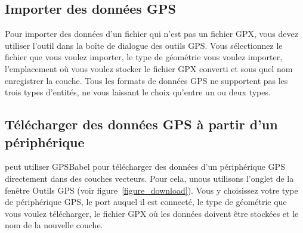 \subsection{Importer des données GPS}

Pour importer des données d'un fichier qui n'est pas un fichier GPX, vous devez utiliser l'outil  dans la boîte de dialogue des outils GPS. Vous sélectionnez le fichier que vous voulez importer, le type de géométrie vous voulez importer, l'emplacement où vous voulez stocker le fichier GPX converti et sous quel nom enregistrer la couche. Tous les formats de données GPS ne supportent pas les trois types d'entités, ne vous laissant le choix qu'entre un ou deux types.

\subsection{Télécharger des données GPS à partir d'un périphérique}


\qg peut utiliser GPSBabel pour télécharger des données d'un périphérique GPS directement dans des couches vecteurs.
Pour cela, unous utilisons l'onglet  de la fenêtre Outils GPS (voir figure~\ref{figure_download}). Vous y choisissez votre type de périphérique GPS, le port auquel il est connecté, le type de géométrie que vous voulez télécharger, le fichier GPX où les données doivent être stockées et le nom de la nouvelle couche.

